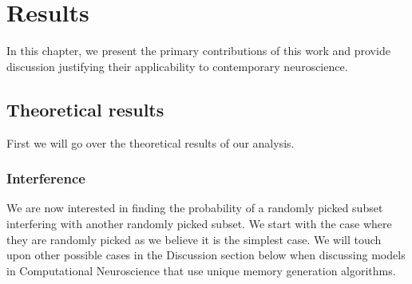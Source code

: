 \chapter{Results}

In this chapter, we present the primary contributions of this work and provide discussion justifying their applicability to contemporary neuroscience. 

\section{Theoretical results}

First we will go over the theoretical results of our analysis. 

\subsection{Interference}

We are now interested in finding the probability of a randomly picked subset interfering with another randomly picked subset. We start with the case where they are randomly picked as we believe it is the simplest case. We will touch upon other possible cases in the Discussion section below when discussing models in Computational Neuroscience that use unique memory generation algorithms.

